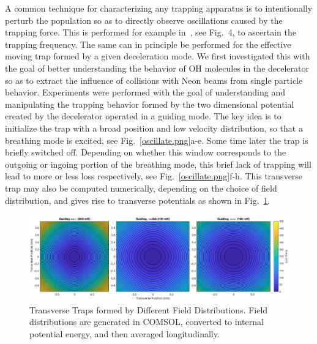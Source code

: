 A common technique for characterizing any trapping apparatus is to intentionally perturb the population so as to directly observe oscillations caused by the trapping force. 
This is performed for example in~\cite{Stuhl2012uwave}, see Fig.~4, to ascertain the trapping frequency.
The same can in principle be performed for the effective moving trap formed by a given deceleration mode.
We first investigated this with the goal of better understanding the behavior of OH molecules in the decelerator so as to extract the influence of collisions with Neon beams from single particle behavior.
Experiments were performed with the goal of understanding and manipulating the trapping behavior formed by the two dimensional potential created by the decelerator operated in a guiding mode.
The key idea is to initialize the trap with a broad position and low velocity distribution, so that a breathing mode is excited, see Fig.~\ref{oscillate.png}a-e.
Some time later the trap is briefly switched off.
Depending on whether this window corresponds to the outgoing or ingoing portion of the breathing mode, this brief lack of trapping will lead to more or less loss respectively, see Fig.~\ref{oscillate.png}f-h.
This transverse trap may also be computed numerically, depending on the choice of field distribution, and gives rise to transverse potentials as shown in Fig.~\ref{fig:guiding_compilation}.


\begin{figure}[t!]
\includegraphics[width=\linewidth]{Slowing/guiding_compilation.png}
\caption[Transverse Guiding Potentials]{\label{fig:guiding_compilation}
Transverse Traps formed by Different Field Distributions. Field distributions are generated in COMSOL, converted to internal potential energy, and then averaged longitudinally.}
\end{figure}


